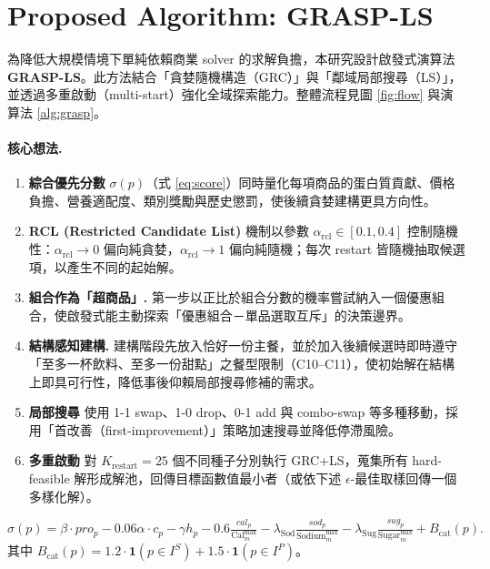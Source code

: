 \documentclass[a4paper]{article}
\begin{document}
\section{Proposed Algorithm: GRASP-LS}\label{sec:alg}
為降低大規模情境下單純依賴商業 solver 的求解負擔，本研究設計啟發式演算法 \textbf{GRASP-LS}。此方法結合「貪婪隨機構造（GRC）」與「鄰域局部搜尋（LS）」，並透過多重啟動（multi-start）強化全域探索能力。整體流程見圖 \ref{fig:flow} 與演算法 \ref{alg:grasp}。

\paragraph{核心想法.}
\begin{enumerate}
\item \textbf{綜合優先分數} $\sigma(p)$（式 \ref{eq:score}）同時量化每項商品的蛋白質貢獻、價格負擔、營養適配度、類別獎勵與歷史懲罰，使後續貪婪建構更具方向性。
\item \textbf{RCL (Restricted Candidate List)} 機制以參數 $\alpha_{\text{rcl}}\in[0.1,0.4]$ 控制隨機性：$\alpha_{\text{rcl}}\to 0$ 偏向純貪婪，$\alpha_{\text{rcl}}\to 1$ 偏向純隨機；每次 restart 皆隨機抽取候選項，以產生不同的起始解。
\item \textbf{組合作為「超商品」.} 第一步以正比於組合分數的機率嘗試納入一個優惠組合，使啟發式能主動探索「優惠組合－單品選取互斥」的決策邊界。
\item \textbf{結構感知建構.} 建構階段先放入恰好一份主餐，並於加入後續候選時即時遵守「至多一杯飲料、至多一份甜點」之餐型限制（C10--C11），使初始解在結構上即具可行性，降低事後仰賴局部搜尋修補的需求。
\item \textbf{局部搜尋} 使用 1-1 swap、1-0 drop、0-1 add 與 combo-swap 等多種移動，採用「首改善（first-improvement）」策略加速搜尋並降低停滯風險。
\item \textbf{多重啟動} 對 $K_{\text{restart}}=25$ 個不同種子分別執行 GRC+LS，蒐集所有 hard-feasible 解形成解池，回傳目標函數值最小者（或依下述 $\epsilon$-最佳取樣回傳一個多樣化解）。
\end{enumerate}
\begin{equation}\label{eq:score}
\sigma(p) = \beta \cdot pro_p - 0.06\alpha\cdot c_p - \gamma h_p - 0.6\tfrac{cal_p}{\text{Cal}^{\max}_m} - \lambda_{\text{Sod}}\tfrac{sod_p}{\text{Sodium}^{\max}_m} - \lambda_{\text{Sug}}\tfrac{sug_p}{\text{Sugar}^{\max}_m} + B_{\text{cat}}(p).
\end{equation}
其中 $B_{\text{cat}}(p) = 1.2 \cdot \mathbf{1}(p\in I^S) + 1.5\cdot \mathbf{1}(p\in I^P)$。
\end{document}
